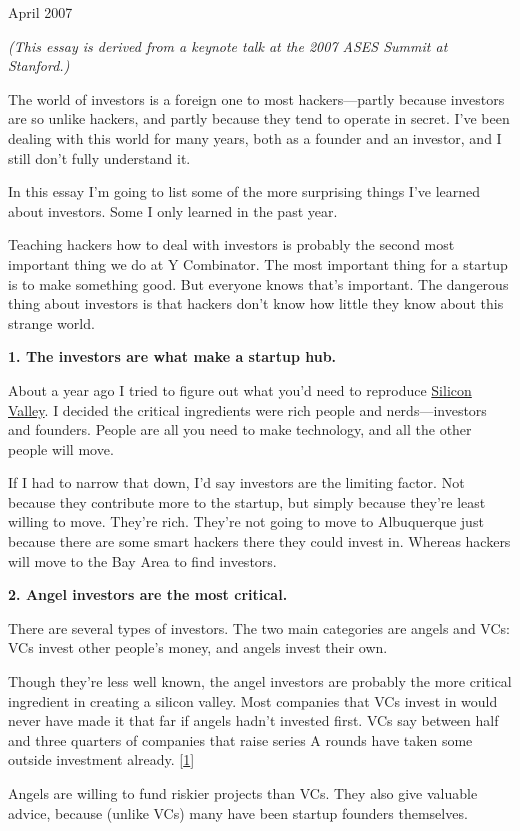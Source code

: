 April 2007

\emph{(This essay is derived from a keynote talk at the 2007 ASES Summit
at Stanford.)}

The world of investors is a foreign one to most hackers---partly because
investors are so unlike hackers, and partly because they tend to operate
in secret. I've been dealing with this world for many years, both as a
founder and an investor, and I still don't fully understand it.

In this essay I'm going to list some of the more surprising things I've
learned about investors. Some I only learned in the past year.

Teaching hackers how to deal with investors is probably the second most
important thing we do at Y Combinator. The most important thing for a
startup is to make something good. But everyone knows that's important.
The dangerous thing about investors is that hackers don't know how
little they know about this strange world.

\textbf{1. The investors are what make a startup hub.}

About a year ago I tried to figure out what you'd need to reproduce
\href{siliconvalley.html}{Silicon Valley}. I decided the critical
ingredients were rich people and nerds---investors and founders. People
are all you need to make technology, and all the other people will move.

If I had to narrow that down, I'd say investors are the limiting factor.
Not because they contribute more to the startup, but simply because
they're least willing to move. They're rich. They're not going to move
to Albuquerque just because there are some smart hackers there they
could invest in. Whereas hackers will move to the Bay Area to find
investors.

\textbf{2. Angel investors are the most critical.}

There are several types of investors. The two main categories are angels
and VCs: VCs invest other people's money, and angels invest their own.

Though they're less well known, the angel investors are probably the
more critical ingredient in creating a silicon valley. Most companies
that VCs invest in would never have made it that far if angels hadn't
invested first. VCs say between half and three quarters of companies
that raise series A rounds have taken some outside investment already.
{[}\hyperref[f1n]{1}{]}

Angels are willing to fund riskier projects than VCs. They also give
valuable advice, because (unlike VCs) many have been startup founders
themselves.

